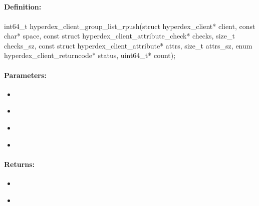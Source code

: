 \pagebreak
\subsection{}
\label{api:c:group_list_rpush}


\paragraph{Definition:}
\begin{ccode}
int64_t hyperdex_client_group_list_rpush(struct hyperdex_client* client,
        const char* space,
        const struct hyperdex_client_attribute_check* checks, size_t checks_sz,
        const struct hyperdex_client_attribute* attrs, size_t attrs_sz,
        enum hyperdex_client_returncode* status,
        uint64_t* count);
\end{ccode}

\paragraph{Parameters:}
\begin{itemize}[noitemsep]
\item {}\\

\item {}\\

\item {}\\

\item {}\\

\end{itemize}

\paragraph{Returns:}
\begin{itemize}[noitemsep]
\item {}\\

\item {}\\

\end{itemize}

